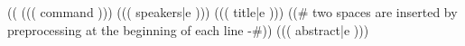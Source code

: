 

((%
((( command ))){%
  ((( speakers|e )))%
}{%
  ((( title|e )))%
}{%
}{%
((# two spaces are inserted by preprocessing at the beginning of each line -#))
((( abstract|e )))%
}


